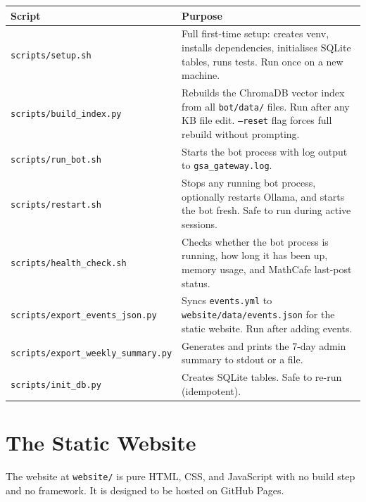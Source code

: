 \documentclass[12pt,letterpaper]{article}
\begin{document}
\begin{center}
\begin{longtable}{lp{9cm}}
\toprule
\textbf{Script} & \textbf{Purpose} \\
\midrule
\texttt{scripts/setup.sh} & Full first-time setup: creates venv, installs dependencies,
  initialises SQLite tables, runs tests. Run once on a new machine. \\
\texttt{scripts/build\_index.py} & Rebuilds the ChromaDB vector index from all
  \texttt{bot/data/} files. Run after any KB file edit.
  \texttt{--reset} flag forces full rebuild without prompting. \\
\texttt{scripts/run\_bot.sh} & Starts the bot process with log output to
  \texttt{gsa\_gateway.log}. \\
\texttt{scripts/restart.sh} & Stops any running bot process, optionally restarts
  Ollama, and starts the bot fresh. Safe to run during active sessions. \\
\texttt{scripts/health\_check.sh} & Checks whether the bot process is running,
  how long it has been up, memory usage, and MathCafe last-post status. \\
\texttt{scripts/export\_events\_json.py} & Syncs \texttt{events.yml} to
  \texttt{website/data/events.json} for the static website. Run after
  adding events. \\
\texttt{scripts/export\_weekly\_summary.py} & Generates and prints the 7-day
  admin summary to stdout or a file. \\
\texttt{scripts/init\_db.py} & Creates SQLite tables. Safe to re-run
  (idempotent). \\
\bottomrule
\end{longtable}
\end{center}

\section{The Static Website}

The website at \texttt{website/} is pure HTML, CSS, and JavaScript with no
build step and no framework. It is designed to be hosted on GitHub Pages.
\end{document}
